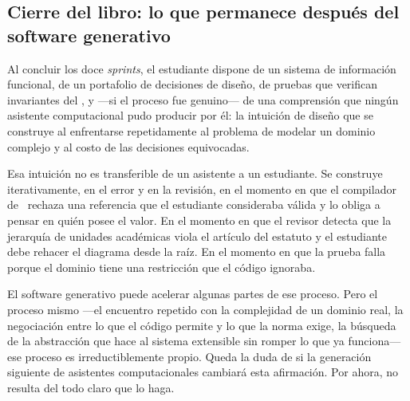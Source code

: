 \bigskip

\subsection*{Cierre del libro: lo que permanece después del software generativo}
\label{subsec:cierre}

\noindent
Al concluir los doce \textit{sprints}, el estudiante dispone de un sistema
de información funcional, de un portafolio de decisiones de diseño, de pruebas
que verifican invariantes del \acuerdo, y ---si el proceso fue genuino--- de una
comprensión que ningún asistente computacional pudo producir por él: la intuición
de diseño que se construye al enfrentarse repetidamente al problema de modelar
un dominio complejo y al costo de las decisiones equivocadas.

Esa intuición no es transferible de un asistente a un estudiante. Se construye
iterativamente, en el error y en la revisión, en el momento en que el compilador
de \rust\ rechaza una referencia que el estudiante consideraba válida y lo obliga
a pensar en quién posee el valor. En el momento en que el revisor detecta que
la jerarquía de unidades académicas viola el artículo del estatuto y el estudiante
debe rehacer el diagrama desde la raíz. En el momento en que la prueba falla
porque el dominio tiene una restricción que el código ignoraba.

El software generativo puede acelerar algunas partes de ese proceso. Pero el
proceso mismo ---el encuentro repetido con la complejidad de un dominio real,
la negociación entre lo que el código permite y lo que la norma exige, la
búsqueda de la abstracción que hace al sistema extensible sin romper lo que ya
funciona--- ese proceso es irreductiblemente propio. Queda la duda de si la
generación siguiente de asistentes computacionales cambiará esta afirmación.
Por ahora, no resulta del todo claro que lo haga.
